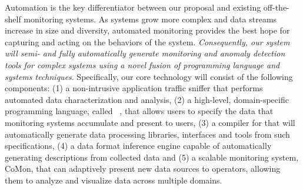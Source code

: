 Automation is the key differentiator between our
proposal and existing off-the-shelf monitoring systems. 
As systems grow more complex and data streams increase in size and
diversity, automated monitoring provides the best hope for capturing
and acting on the behaviors of the system. {\em Consequently, our system
will semi- and fully automatically generate monitoring and
anomaly detection tools for complex systems using a novel fusion of
programming language and systems techniques}.
Specifically, our core technology will consist of
the following components: (1) a non-intrusive application traffic
sniffer that performs automated data characterization and analysis,
(2) a high-level, domain-specific programming language, called
\pads{}~\cite{fisher+:pads,fisher+:popl06,mandelbaum+:pads-ml}, that
allows users to specify the data that monitoring systems 
accumulate and present to users, (3) a compiler for \pads{} that will
automatically generate data processing libraries, interfaces and tools
from such specifications, (4) a data format inference engine capable
of automatically generating \pads{} descriptions from
collected data and (5) a scalable monitoring system, CoMon, that can
adaptively present new data sources to operators, allowing them to
analyze and visualize data across multiple domains.



